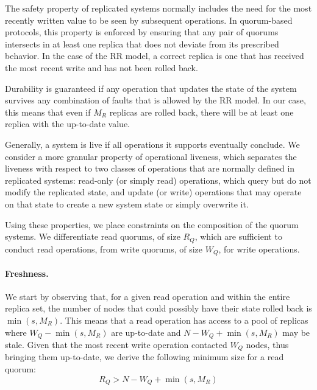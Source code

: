 \begin{property}[Freshness]
    The safety property of replicated systems normally includes
    the need for the most recently written value to be seen by
    subsequent operations. In quorum-based protocols, this
    property is enforced by ensuring that any pair of quorums
    intersects in at least one replica that does not deviate from
    its prescribed behavior. In the case of the \ac{RR} model, a
    correct replica is one that has received the most recent
    write and has not been rolled back.
\end{property}


\begin{property}[Durability]
    Durability is guaranteed if any operation that updates the
    state of the system survives any combination of faults that
    is allowed by the \ac{RR} model. In our case, this means that
    even if $M_R$ replicas are rolled back, there will be at
    least one replica with the up-to-date value.
\end{property}

\begin{property}
    Generally, a system is live if all operations it supports eventually
    conclude.  We consider a more granular property of operational
    liveness, which separates the liveness with respect to two classes
    of operations that are normally defined in replicated systems:
    read-only (or simply read) operations, which query but do not modify
    the replicated state, and update (or write) operations that may
    operate on that state to create a new system state or simply overwrite
    it.
\end{property}

Using these properties, we place constraints on the composition
of the quorum systems. We differentiate read quorums, of size
$R_Q$, which are sufficient to conduct read operations, from
write quorums, of size $W_Q$, for write operations.

\paragraph{Freshness.}

We start by observing that, for a given read operation and within
the entire replica set, the number of nodes that could possibly
have their state rolled back is $\min(s, M_R)$. This means that a
read operation has access to a pool of replicas where $W_Q -
\min(s, M_R)$ are up-to-date and $N - W_Q + \min(s, M_R)$ may be
stale. Given that the most recent write operation contacted $W_Q$
nodes, thus bringing them up-to-date, we derive the following
minimum size for a read quorum:
\begin{equation} \label{eq:inters}
  R_Q > N - W_Q + \min(s, M_R)
\end{equation}

